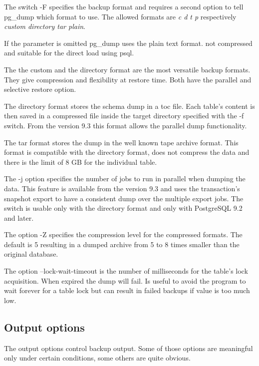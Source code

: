The switch  -F specifies the backup format and requires a second 
option to tell pg\_dump which format to use. The allowed formats are \textit{c d t p} respectively 
\textit{custom directory tar plain}.\newline

If the parameter is omitted pg\_dump uses the plain text format. not compressed and suitable for the direct 
load using psql. \newline

The the custom and the directory format are the most versatile backup formats. They give compression and 
flexibility at restore time. Both have the parallel and selective restore option.\newline

The directory format stores the schema dump in a toc file. Each table's content is then saved in a 
compressed file inside the target directory specified with the -f switch. From the version 9.3 this format 
allows the parallel dump functionality. \newline

The tar format stores the dump in the well known tape archive format. This format is compatible 
with the directory format, does not compress the data and there is the limit of 8 GB for the individual
table.\newline

The -j option specifies the number of jobs to run in parallel when dumping the data. This feature is 
available from the version 9.3 and uses the transaction's snapshot export to have a consistent dump over 
the multiple export jobs. The switch is usable only with the directory format and only with PostgreSQL 9.2 
and later.\newline 

The option -Z specifies the compression level for the compressed formats. The default is 5 
resulting in a dumped archive from 5 to 8 times smaller than the original database. 

The option --lock-wait-timeout is the number of milliseconds for the table's lock acquisition. 
When expired the dump will fail. Is useful to avoid the program to wait forever for a table lock 
but can result in failed backups if value is too much low.

\subsection{Output options}
\label{sub:PGDUMPOUTPUT}
The output options control backup output. Some of those options are meaningful only under certain 
conditions, some others are quite obvious.\newline

